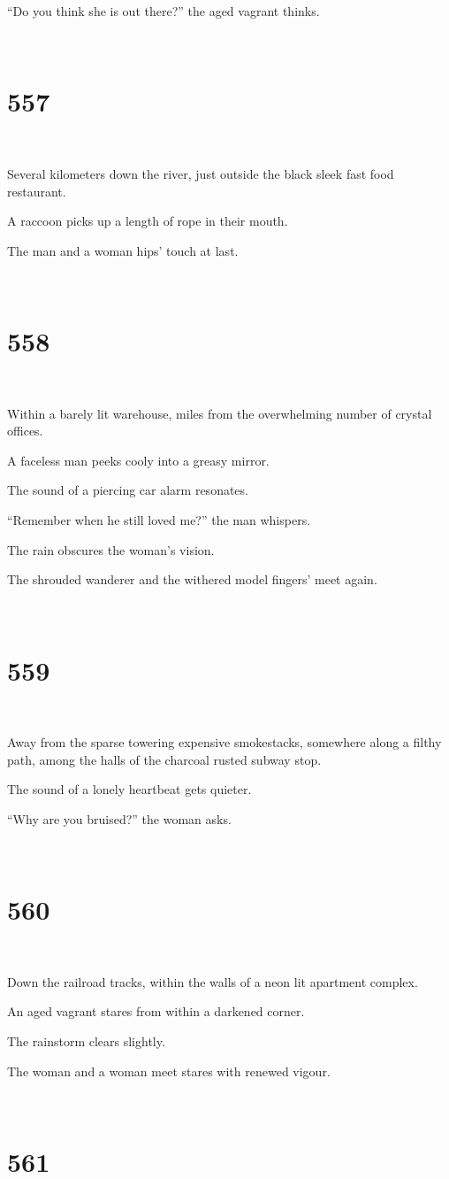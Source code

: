 \documentclass{report}
\begin{document}
``Do you think she is out there?'' the aged vagrant thinks.

~
\chapter*{557}
~

Several kilometers down the river, just outside the black sleek fast food restaurant.

A raccoon picks up a length of rope in their mouth.

The man and a woman hips' touch at last.

~
\chapter*{558}
~

Within a barely lit warehouse, miles from the overwhelming number of crystal offices.

A faceless man peeks cooly into a greasy mirror.

The sound of a piercing car alarm resonates.

``Remember when he still loved me?'' the man whispers.

The rain obscures the woman's vision.

The shrouded wanderer and the withered model fingers' meet again.

~
\chapter*{559}
~

Away from the sparse towering expensive smokestacks, somewhere along a filthy path, among the halls of the charcoal rusted subway stop.

The sound of a lonely heartbeat gets quieter.

``Why are you bruised?'' the woman asks.

~
\chapter*{560}
~

Down the railroad tracks, within the walls of a neon lit apartment complex.

An aged vagrant stares from within a darkened corner.

The rainstorm clears slightly.

The woman and a woman meet stares with renewed vigour.

~
\chapter*{561}
~
\end{document}

